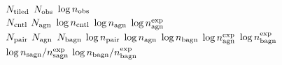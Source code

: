             $N_{\rm tiled}$	
               $N_{\rm obs}$	
         $\log n_{\rm obs}$
\hline
{}\\
\hline               
	      $N_{\rm cntl}$	
	       $N_{\rm agn}$	
         $\log n_{\rm cntl}$	
          $\log n_{\rm agn}$	
$\log n_{\rm agn}^{\rm exp}$	
\hline
{}\\
\hline
              $N_{\rm pair}$	
               $N_{\rm agn}$
              $N_{\rm bagn}$	
         $\log n_{\rm pair}$	
          $\log n_{\rm agn}$
         $\log n_{\rm bagn}$	
$\log n_{\rm agn}^{\rm exp}$
$\log n_{\rm bagn}^{\rm exp}$	      
\hline
{}\\
\hline
$\log n_{\rm sagn}/n_{\rm sagn}^{\rm exp}$        
$\log n_{\rm bagn}/n_{\rm bagn}^{\rm exp}$
